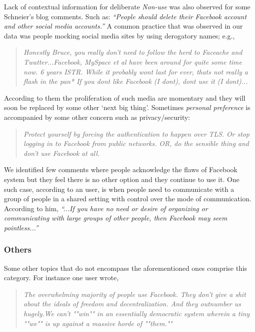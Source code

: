     Lack of contextual information for deliberate \emph{Non-use} was also observed for some Schneier's blog comments. Such as: \textit{``People should delete their Facebook account and other social media accounts.''} A common practice that was observed in our data was people mocking social media sites by using derogatory names; e.g.,
    
    \begin{quote}
         \textit{Honestly Bruce, you really don't need to follow the herd to Faceache and Twatter...Facebook, MySpace et al have been around for quite some time now. 6 years ISTR. While it probably wont last for ever, thats not really a flash in the pan* If you dont like Facebook (I dont), dont use it (I dont)...}
    \end{quote}
    
    According to them the proliferation of such media are momentary and they will soon be replaced by some other `next big thing'. Sometimes \textit{personal preference} is accompanied by some other concern such as privacy/security:
    \begin{quote}
         \textit{Protect yourself by forcing the authentication to happen over TLS. Or stop logging in to Facebook from public networks. OR, do the sensible thing and don't use Facebook at all.}
    \end{quote}
    
    We identified few comments where people acknowledge the flaws of Facebook system but they feel there is no other option and they continue to use it. One such case, according to an user, is when people need to communicate with a group of people in a shared setting with control over the mode of communication. According to him, \textit{``...If you have no need or desire of organizing or communicating with large groups of other people, then Facebook may seem pointless...''}
    
\subsubsection{Others}

Some other topics that do not encompass the aforementioned ones comprise this category. For instance one user wrote, 
\begin{quote}
         \textit{The overwhelming majority of people use Facebook. They don't give a shit about the ideals of freedom and decentralization. And they outnumber us hugely.We can't ""win"" in an essentially democratic system wherein a tiny ""we"" is up against a massive horde of ""them.""}
    \end{quote}

